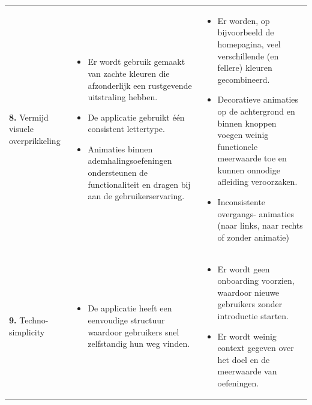 {\begin{longtable}{
            >{\raggedright\arraybackslash}p{5.23cm}
            >{\raggedright\arraybackslash}p{4.93cm}
            >{\raggedright\arraybackslash}p{4.93cm}
        }
        \addlinespace[5pt]
        
        \textbf{8.} Vermijd visuele overprikkeling
        & 
        \begin{itemize}[nosep,leftmargin=*,itemsep=10pt]
            \renewcommand{\labelitemi}{+}
            \item Er wordt gebruik gemaakt van zachte kleuren die afzonderlijk een rustgevende uitstraling hebben.
            \item De applicatie gebruikt één consistent lettertype.
            \item Animaties binnen ademhalingsoefeningen ondersteunen de functionaliteit en dragen bij aan de gebruikerservaring.
        \end{itemize}
        & 
        \begin{itemize}[nosep,leftmargin=*,itemsep=10pt]
            \renewcommand{\labelitemi}{-}
            \item Er worden, op bijvoorbeeld de homepagina, veel verschillende (en fellere) kleuren gecombineerd.
            \item Decoratieve animaties op de achtergrond en binnen knoppen voegen weinig functionele meerwaarde toe en kunnen onnodige afleiding veroorzaken.
            \item Inconsistente overgangs- animaties (naar links, naar rechts of zonder animatie)
        \end{itemize}
        \\
        
        \addlinespace[5pt]
        
        \textbf{9.} Techno-simplicity
        & 
        \begin{itemize}[nosep,leftmargin=*,itemsep=10pt]
            \renewcommand{\labelitemi}{+}
            \item De applicatie heeft een eenvoudige structuur waardoor gebruikers snel zelfstandig hun weg vinden.
        \end{itemize}
        & 
        \begin{itemize}[nosep,leftmargin=*,itemsep=10pt]
            \renewcommand{\labelitemi}{-}
            \item Er wordt geen onboarding voorzien, waardoor nieuwe gebruikers zonder introductie starten.
            \item Er wordt weinig context gegeven over het doel en de meerwaarde van oefeningen.
        \end{itemize}
        \\
        

\end{longtable}}
